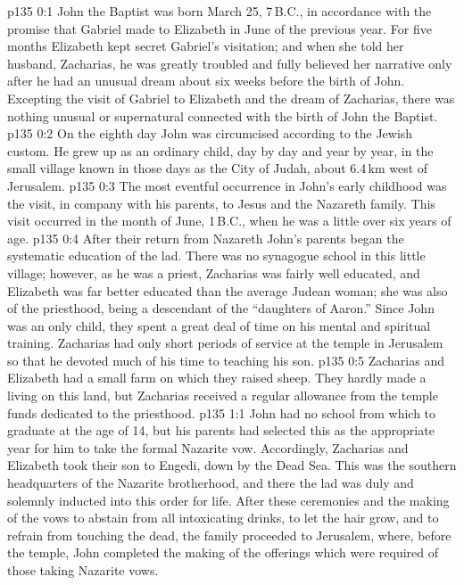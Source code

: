 \author{Midwayer Commission}
\vs p135 0:1 John the Baptist was born March 25, 7\,B.C., in accordance with the promise that Gabriel made to Elizabeth in June of the previous year. For five months Elizabeth kept secret Gabriel’s visitation; and when she told her husband, Zacharias, he was greatly troubled and fully believed her narrative only after he had an unusual dream about six weeks before the birth of John. Excepting the visit of Gabriel to Elizabeth and the dream of Zacharias, there was nothing unusual or supernatural connected with the birth of John the Baptist.
\vs p135 0:2 On the eighth day John was circumcised according to the Jewish custom. He grew up as an ordinary child, day by day and year by year, in the small village known in those days as the City of Judah, about 6.4\,km west of Jerusalem.
\vs p135 0:3 The most eventful occurrence in John’s early childhood was the visit, in company with his parents, to Jesus and the Nazareth family. This visit occurred in the month of June, 1\,B.C., when he was a little over six years of age.
\vs p135 0:4 After their return from Nazareth John’s parents began the systematic education of the lad. There was no synagogue school in this little village; however, as he was a priest, Zacharias was fairly well educated, and Elizabeth was far better educated than the average Judean woman; she was also of the priesthood, being a descendant of the “daughters of Aaron.” Since John was an only child, they spent a great deal of time on his mental and spiritual training. Zacharias had only short periods of service at the temple in Jerusalem so that he devoted much of his time to teaching his son.
\vs p135 0:5 Zacharias and Elizabeth had a small farm on which they raised sheep. They hardly made a living on this land, but Zacharias received a regular allowance from the temple funds dedicated to the priesthood.
\vs p135 1:1 John had no school from which to graduate at the age of 14, but his parents had selected this as the appropriate year for him to take the formal Nazarite vow. Accordingly, Zacharias and Elizabeth took their son to Engedi, down by the Dead Sea. This was the southern headquarters of the Nazarite brotherhood, and there the lad was duly and solemnly inducted into this order for life. After these ceremonies and the making of the vows to abstain from all intoxicating drinks, to let the hair grow, and to refrain from touching the dead, the family proceeded to Jerusalem, where, before the temple, John completed the making of the offerings which were required of those taking Nazarite vows.
